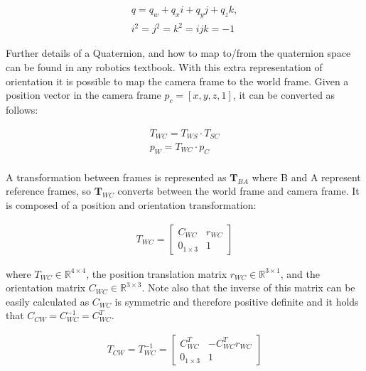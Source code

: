 \documentclass[11pt,twoside]{report}
\begin{document}
\begin{equation}
\begin{aligned}
\label{quaternion}
q = q_{w} + q_{x}i + q_{y}j+q_{z}k, \\
i^{2}=j^{2}=k^{2}=ijk=-1
\end{aligned}
\end{equation}

Further details of a Quaternion, and how to map to/from the quaternion space can be found in any robotics textbook. With this extra representation of orientation it is possible to map the camera frame to the world frame. Given a position vector in the camera frame $p_{c} = [x,y,z,1]$, it can be converted as follows:


\begin{equation}
\begin{aligned}
T_{WC} = T_{WS} \cdot T_{SC} \\
p_{W} = T_{WC} \cdot p_{C} \\
\end{aligned}
\label{matmul_w2c}
\end{equation}

A transformation between frames is represented as $\textbf{T}_{BA}$ where B and A represent reference frames, so $\textbf{T}_{WC}$ converts between the world frame and camera frame. It is composed of a position and orientation transformation:

\begin{equation}
\begin{aligned}
T_{WC} = 
\begin{bmatrix}
C_{WC} & r_{WC} \\
0_{1 \times 3} & 1
\end{bmatrix}
\end{aligned}
\end{equation}

where $T_{WC} \in \mathbb{R}^{4 \times 4}$, the position translation matrix $r_{WC} \in \mathbb{R}^{3 \times 1}$, and the orientation matrix $C_{WC} \in \mathbb{R}^{3 \times 3}$. Note also that the inverse of this matrix can be easily calculated as $C_{WC}$ is symmetric and therefore positive definite and it holds that $C_{CW}=C_{WC}^{-1}= C_{WC}^{T}$.

\begin{equation}
\begin{aligned}
T_{CW} = T_{WC}^{-1} = 
\begin{bmatrix}
C_{WC}^{T} & -C_{WC}^{T}r_{WC} \\
0_{1 \times 3} & 1
\end{bmatrix}
\end{aligned}
\label{invert_tmatrix}
\end{equation}
\end{document}
